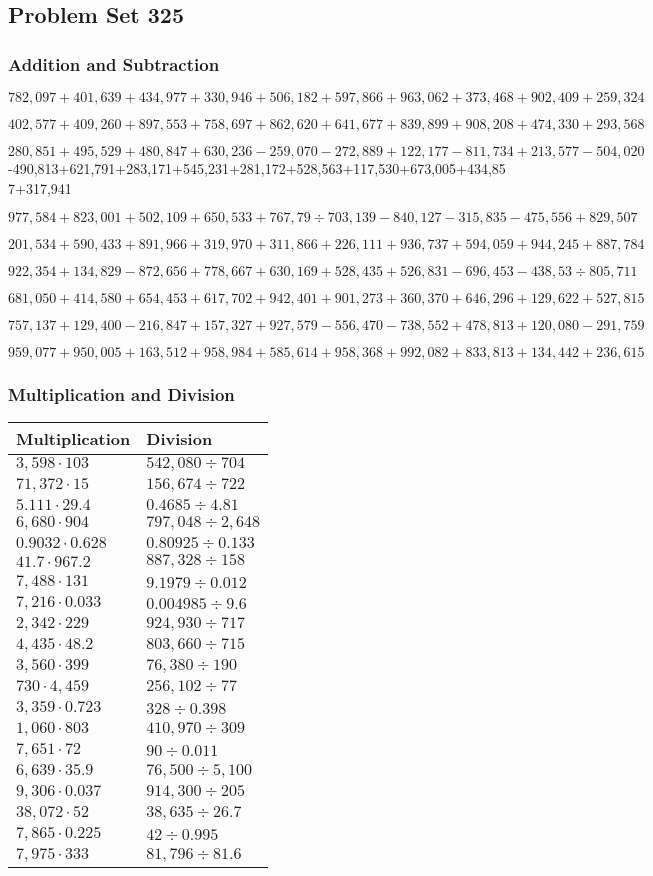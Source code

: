 \hypertarget{problem-set-325}{%
\subsection{Problem Set 325}\label{problem-set-325}}

\hypertarget{addition-and-subtraction}{%
\subsubsection{Addition and
Subtraction}\label{addition-and-subtraction}}

\(782,097+401,639+434,977+330,946+506,182+597,866+963,062+373,468+902,409+259,324\)

\(402,577+409,260+897,553+758,697+862,620+641,677+839,899+908,208+474,330+293,568\)

\(280,851+495,529+480,847+630,236-259,070-272,889+122,177-811,734+213,577-504,020\)
-490,813+621,791+283,171+545,231+281,172+528,563+117,530+673,005+434,857+317,941

\(977,584+823,001+502,109+650,533+767,79÷703,139-840,127-315,835-475,556+829,507\)

\(201,534+590,433+891,966+319,970+311,866+226,111+936,737+594,059+944,245+887,784\)

\(922,354+134,829-872,656+778,667+630,169+528,435+526,831-696,453-438,53÷805,711\)

\(681,050+414,580+654,453+617,702+942,401+901,273+360,370+646,296+129,622+527,815\)

\(757,137+129,400-216,847+157,327+927,579-556,470-738,552+478,813+120,080-291,759\)

\(959,077+950,005+163,512+958,984+585,614+958,368+992,082+833,813+134,442+236,615\)

\hypertarget{multiplication-and-division}{%
\subsubsection{Multiplication and
Division}\label{multiplication-and-division}}

\begin{longtable}[]{@{}ll@{}}
\toprule
Multiplication & Division\tabularnewline
\midrule
\endhead
\(3,598\cdot103\) & \(542,080÷704\)\tabularnewline
\(71,372\cdot15\) & \(156,674÷722\)\tabularnewline
\(5.111\cdot29.4\) & \(0.4685÷4.81\)\tabularnewline
\(6,680\cdot904\) & \(797,048÷2,648\)\tabularnewline
\(0.9032\cdot0.628\) & \(0.80925÷0.133\)\tabularnewline
\(41.7\cdot967.2\) & \(887,328÷158\)\tabularnewline
\(7,488\cdot131\) & \(9.1979÷0.012\)\tabularnewline
\(7,216\cdot0.033\) & \(0.004985÷9.6\)\tabularnewline
\(2,342\cdot229\) & \(924,930÷717\)\tabularnewline
\(4,435\cdot48.2\) & \(803,660÷715\)\tabularnewline
\(3,560\cdot399\) & \(76,380÷190\)\tabularnewline
\(730\cdot4,459\) & \(256,102÷77\)\tabularnewline
\(3,359\cdot0.723\) & \(328÷0.398\)\tabularnewline
\(1,060\cdot803\) & \(410,970÷309\)\tabularnewline
\(7,651\cdot72\) & \(90÷0.011\)\tabularnewline
\(6,639\cdot35.9\) & \(76,500÷5,100\)\tabularnewline
\(9,306\cdot0.037\) & \(914,300÷205\)\tabularnewline
\(38,072\cdot52\) & \(38,635÷26.7\)\tabularnewline
\(7,865\cdot0.225\) & \(42÷0.995\)\tabularnewline
\(7,975\cdot333\) & \(81,796÷81.6\)\tabularnewline
\bottomrule
\end{longtable}

